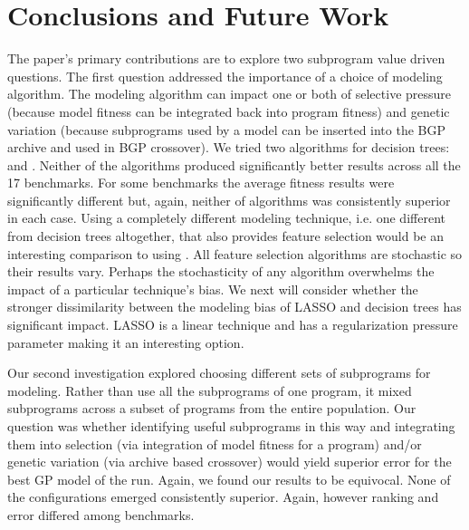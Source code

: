 \section{Conclusions and Future Work}\label{sect:conc}

The paper's primary contributions are to explore two subprogram value driven questions.  The first question addressed the importance of a choice of modeling algorithm. The modeling algorithm can impact one or both of selective pressure (because model fitness can be integrated back into program fitness) and genetic variation (because subprograms used by a model can be inserted into the BGP archive and used in BGP crossover).   We tried two algorithms for decision trees: \REPTREE and \SCIKIT. Neither of the algorithms produced significantly better results across all the 17 benchmarks.  For some benchmarks  the average fitness results were significantly different but, again, neither of algorithms was consistently superior in each case. 
Using a completely different modeling technique, i.e. one different from decision trees altogether,  that also provides feature selection would be an interesting comparison to using \REPTREE.  All feature selection algorithms are stochastic so their results vary. Perhaps the stochasticity of any algorithm overwhelms the impact of a particular technique's bias. We next will consider whether the stronger dissimilarity between the modeling bias of LASSO and decision trees has significant impact. LASSO is a linear technique and has a regularization pressure parameter making it an interesting option.


Our second investigation explored choosing different sets of subprograms for modeling. Rather than use all the subprograms of one program, it mixed subprograms across a subset of programs from the entire population. Our question was whether identifying useful subprograms in this way and integrating them into selection (via integration of model fitness for a program) and/or genetic variation (via archive based crossover) would yield superior error for the best GP model of the run.  Again, we found our results to be equivocal.  None of the configurations emerged consistently superior. Again, however ranking and error differed among benchmarks. 

